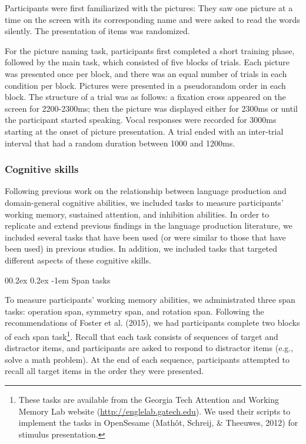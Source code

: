 \documentclass[
  man,floatsintext]{apa6}
\makeatletter
\let\oldparagraph\paragraph
\renewcommand{\paragraph}[1]{\oldparagraph{#1}\mbox{}}
\renewcommand{\paragraph}{\@startsection{paragraph}{4}{\parindent}%
  {0\baselineskip \@plus 0.2ex \@minus 0.2ex}%
  {-1em}%
  {\normalfont\normalsize\bfseries\itshape\typesectitle}}
\makeatother
\begin{document}
Participants were first familiarized with the pictures: They saw one picture at a time on the screen with its corresponding name and were asked to read the words silently. The presentation of items was randomized.

For the picture naming task, participants first completed a short training phase, followed by the main task, which consisted of five blocks of trials. Each picture was presented once per block, and there was an equal number of trials in each condition per block. Pictures were presented in a pseudorandom order in each block. The structure of a trial was as follows: a fixation cross appeared on the screen for 2200-2300ms; then the picture was displayed either for 2300ms or until the participant started speaking. Vocal responses were recorded for 3000ms starting at the onset of picture presentation. A trial ended with an inter-trial interval that had a random duration between 1000 and 1200ms.

\hypertarget{cognitive-skills}{%
\subsubsection{Cognitive skills}\label{cognitive-skills}}

Following previous work on the relationship between language production and domain-general cognitive abilities, we included tasks to measure participants' working memory, sustained attention, and inhibition abilities. In order to replicate and extend previous findings in the language production literature, we included several tasks that have been used (or were similar to those that have been used) in previous studies. In addition, we included tasks that targeted different aspects of these cognitive skills.

\hypertarget{span-tasks}{%
\paragraph{Span tasks}\label{span-tasks}}

To measure participants' working memory abilities, we administrated three span tasks: operation span, symmetry span, and rotation span. Following the recommendations of Foster et al. (2015), we had participants complete two blocks of each span task\footnote{These tasks are available from the Georgia Tech Attention and Working Memory Lab website (\url{http://englelab.gatech.edu}). We used their scripts to implement the tasks in OpenSesame (Mathôt, Schreij, \& Theeuwes, 2012) for stimulus presentation.}. Recall that each task consists of sequences of target and distractor items, and participants are asked to respond to distractor items (e.g., solve a math problem). At the end of each sequence, participants attempted to recall all target items in the order they were presented.
\end{document}
